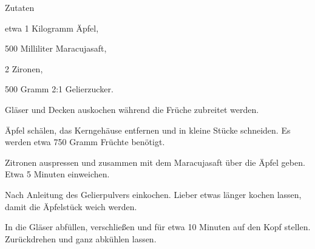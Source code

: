 \startsection[title={AMaZi-Marmelade},reference=amazimarmelade]

\startitemize
\item Zutaten
      \startitemize
      \item etwa 1 Kilogramm Äpfel,
      \item 500 Milliliter Maracujasaft,
      \item 2 Zironen,
      \item 500 Gramm 2:1 Gelierzucker.
      \stopitemize

\item Gläser und Decken auskochen während die Früche zubreitet werden.
\item Äpfel schälen, das Kerngehäuse entfernen und in kleine Stücke
      schneiden. Es werden etwa 750 Gramm Früchte benötigt.
\item Zitronen auspressen und zusammen mit dem Maracujasaft über die
      Äpfel geben. Etwa 5 Minuten einweichen.
\item Nach Anleitung des Gelierpulvers einkochen. Lieber etwas länger
      kochen lassen, damit die Äpfelstück weich werden.
\item In die Gläser abfüllen, verschließen und für etwa 10 Minuten
      auf den Kopf stellen. Zurückdrehen und ganz abkühlen lassen.
\stopitemize

\stopsection
